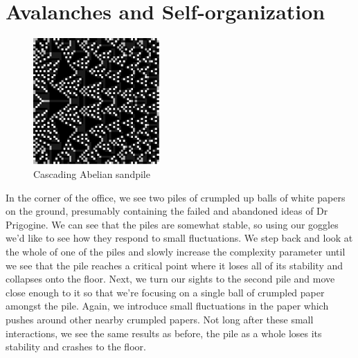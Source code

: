 \documentclass{article}
\begin{document}
\section{Avalanches and Self-organization}

\begin{figure}
  \begin{center}
    \includegraphics[width=0.43\textwidth]{abelian_sandpile.png}
    \caption{Cascading Abelian sandpile}
  \end{center}
\end{figure}

In the corner of the office, we see two piles of crumpled up balls of white papers on the ground, presumably containing the failed and abandoned ideas of Dr Prigogine. We can see that the piles are somewhat stable, so using our goggles we'd like to see how they respond to small fluctuations. We step back and look at the whole of one of the piles and slowly increase the complexity parameter until we see that the pile reaches a critical point where it loses all of its stability and collapses onto the floor. Next, we turn our sights to the second pile and move close enough to it so that we're focusing on a single ball of crumpled paper amongst the pile. Again, we introduce small fluctuations in the paper which pushes around other nearby crumpled papers. Not long after these small interactions, we see the same results as before, the pile as a whole loses its stability and crashes to the floor.
\end{document}
